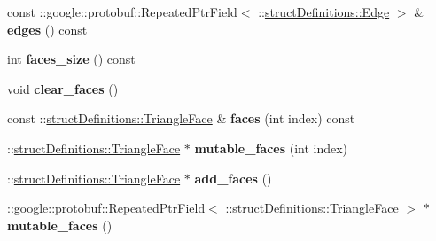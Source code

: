 \begin{DoxyCompactItemize}
\item 
\hypertarget{classstruct_definitions_1_1_data_package_a0a6b251722dad6f0251588e963f3bef1}{}\label{classstruct_definitions_1_1_data_package_a0a6b251722dad6f0251588e963f3bef1} 
const \+::google\+::protobuf\+::\+Repeated\+Ptr\+Field$<$ \+::\hyperlink{classstruct_definitions_1_1_edge}{struct\+Definitions\+::\+Edge} $>$ \& {\bfseries edges} () const
\item 
\hypertarget{classstruct_definitions_1_1_data_package_a3a5925e845ed51b1ab529775c465c8f2}{}\label{classstruct_definitions_1_1_data_package_a3a5925e845ed51b1ab529775c465c8f2} 
int {\bfseries faces\+\_\+size} () const
\item 
\hypertarget{classstruct_definitions_1_1_data_package_ae836a0351c8f5f926412aeb3cb89196b}{}\label{classstruct_definitions_1_1_data_package_ae836a0351c8f5f926412aeb3cb89196b} 
void {\bfseries clear\+\_\+faces} ()
\item 
\hypertarget{classstruct_definitions_1_1_data_package_ab2ac84ad35f7f0658531ddd835d07b1a}{}\label{classstruct_definitions_1_1_data_package_ab2ac84ad35f7f0658531ddd835d07b1a} 
const \+::\hyperlink{classstruct_definitions_1_1_triangle_face}{struct\+Definitions\+::\+Triangle\+Face} \& {\bfseries faces} (int index) const
\item 
\hypertarget{classstruct_definitions_1_1_data_package_a6d8bd3b70904377ead1c15401f811316}{}\label{classstruct_definitions_1_1_data_package_a6d8bd3b70904377ead1c15401f811316} 
\+::\hyperlink{classstruct_definitions_1_1_triangle_face}{struct\+Definitions\+::\+Triangle\+Face} $\ast$ {\bfseries mutable\+\_\+faces} (int index)
\item 
\hypertarget{classstruct_definitions_1_1_data_package_a357587d93aaee1d9580919ff419cfeb5}{}\label{classstruct_definitions_1_1_data_package_a357587d93aaee1d9580919ff419cfeb5} 
\+::\hyperlink{classstruct_definitions_1_1_triangle_face}{struct\+Definitions\+::\+Triangle\+Face} $\ast$ {\bfseries add\+\_\+faces} ()
\item 
\hypertarget{classstruct_definitions_1_1_data_package_a2b5d508417dd51a3dfd43365d813ad88}{}\label{classstruct_definitions_1_1_data_package_a2b5d508417dd51a3dfd43365d813ad88} 
\+::google\+::protobuf\+::\+Repeated\+Ptr\+Field$<$ \+::\hyperlink{classstruct_definitions_1_1_triangle_face}{struct\+Definitions\+::\+Triangle\+Face} $>$ $\ast$ {\bfseries mutable\+\_\+faces} ()
\item 
\hypertarget{classstruct_definitions_1_1_data_package_ac0b847bac914917fbb63d5f3c8cac65d}{}\label{classstruct_definitions_1_1_data_package_ac0b847bac914917fbb63d5f3c8cac65d} 

\end{DoxyCompactItemize}

